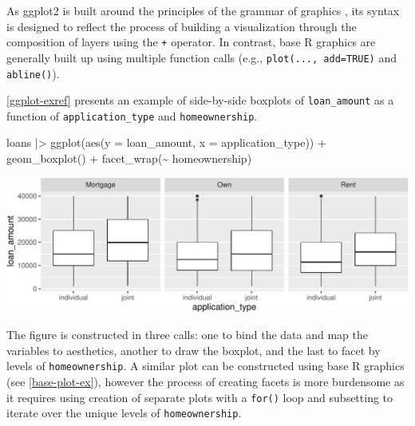 \documentclass[12pt]{article}
\newenvironment{Shaded}{\begin{snugshade}}{\end{snugshade}}
\newcommand{\AttributeTok}[1]{\textcolor[rgb]{0.77,0.63,0.00}{#1}}
\newcommand{\FunctionTok}[1]{\textcolor[rgb]{0.00,0.00,0.00}{#1}}
\newcommand{\NormalTok}[1]{#1}
\newcommand{\SpecialCharTok}[1]{\textcolor[rgb]{0.00,0.00,0.00}{#1}}
\begin{document}
As ggplot2 is built around the principles of the grammar of graphics
\citep{wilkinson2012grammar}, its syntax is designed to reflect the
process of building a visualization through the composition of layers
using the \texttt{+} operator. In contrast, base R graphics are
generally built up using multiple function calls (e.g.,
\texttt{plot(...,\ add=TRUE)} and \texttt{abline()}).

\ref{ggplot-exref} presents an example of side-by-side boxplots of
\texttt{loan\_amount} as a function of \texttt{application\_type} and
\texttt{homeownership}.

\linespread{1}

\begin{Shaded}
\begin{Highlighting}[]
\NormalTok{loans }\SpecialCharTok{|\textgreater{}}
  \FunctionTok{ggplot}\NormalTok{(}\FunctionTok{aes}\NormalTok{(}\AttributeTok{y =}\NormalTok{ loan\_amount, }\AttributeTok{x =}\NormalTok{ application\_type)) }\SpecialCharTok{+}
  \FunctionTok{geom\_boxplot}\NormalTok{() }\SpecialCharTok{+}
  \FunctionTok{facet\_wrap}\NormalTok{(}\SpecialCharTok{\textasciitilde{}}\NormalTok{ homeownership)}
\end{Highlighting}
\end{Shaded}

\begin{center}\includegraphics[width=1\linewidth]{educators-perspective-tidyverse_files/figure-latex/ggplot_ex-1} \end{center}

\label{ggplot-exref} \linespread{2}
\vspace{3mm}\setlength{\parindent}{15pt}

The figure is constructed in three calls: one to bind the data and map
the variables to aesthetics, another to draw the boxplot, and the last
to facet by levels of \texttt{homeownership}. A similar plot can be
constructed using base R graphics (see \ref{base-plot-ex}), however the
process of creating facets is more burdensome as it requires using
creation of separate plots with a \texttt{for()} loop and subsetting to
iterate over the unique levels of \texttt{homeownership}.
\end{document}
